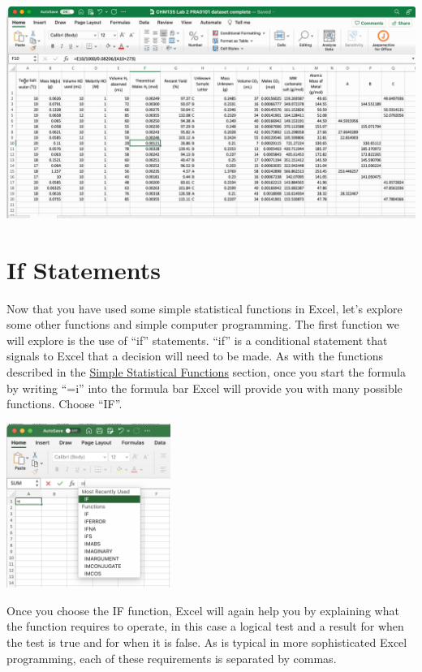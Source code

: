 \documentclass[
]{book}
\begin{document}
\includegraphics{./gifs/sort.gif}

\hypertarget{if-statements}{%
\section{If Statements}\label{if-statements}}

Now that you have used some simple statistical functions in Excel, let's explore some other functions and simple computer programming. The first function we will explore is the use of ``if'' statements. ``if'' is a conditional statement that signals to Excel that a decision will need to be made. As with the functions described in the \protect\hyperlink{simple-statistical-functions}{Simple Statistical Functions} section, once you start the formula by writing ``=i'' into the formula bar Excel will provide you with many possible functions. Choose ``IF''.

\includegraphics[width=0.4\textwidth,height=\textheight]{images/ifstatement1.png}

Once you choose the IF function, Excel will again help you by explaining what the function requires to operate, in this case a logical test and a result for when the test is true and for when it is false. As is typical in more sophisticated Excel programming, each of these requirements is separated by commas.
\end{document}
